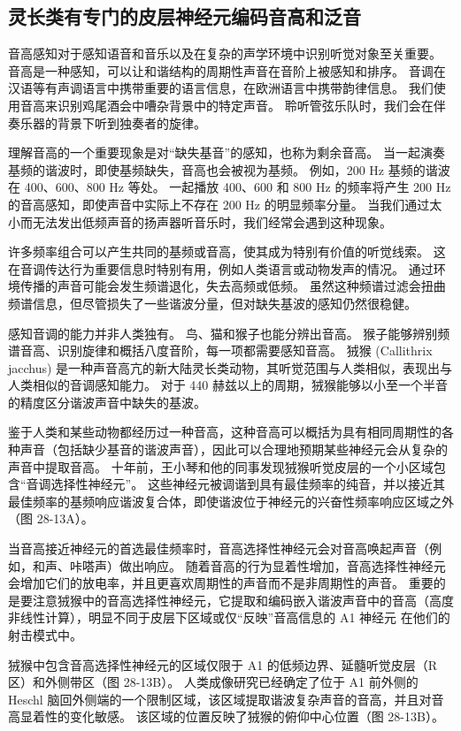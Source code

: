 \subsection{灵长类有专门的皮层神经元编码音高和泛音}
音高感知对于感知语音和音乐以及在复杂的声学环境中识别听觉对象至关重要。 音高是一种感知，可以让和谐结构的周期性声音在音阶上被感知和排序。 音调在汉语等有声调语言中携带重要的语言信息，在欧洲语言中携带韵律信息。 我们使用音高来识别鸡尾酒会中嘈杂背景中的特定声音。 聆听管弦乐队时，我们会在伴奏乐器的背景下听到独奏者的旋律。

理解音高的一个重要现象是对“缺失基音”的感知，也称为剩余音高。 当一起演奏基频的谐波时，即使基频缺失，音高也会被视为基频。 例如，200 Hz 基频的谐波在 400、600、800 Hz 等处。 一起播放 400、600 和 800 Hz 的频率将产生 200 Hz 的音高感知，即使声音中实际上不存在 200 Hz 的明显频率分量。 当我们通过太小而无法发出低频声音的扬声器听音乐时，我们经常会遇到这种现象。

许多频率组合可以产生共同的基频或音高，使其成为特别有价值的听觉线索。 这在音调传达行为重要信息时特别有用，例如人类语言或动物发声的情况。 通过环境传播的声音可能会发生频谱退化，失去高频或低频。 虽然这种频谱过滤会扭曲频谱信息，但尽管损失了一些谐波分量，但对缺失基波的感知仍然很稳健。

感知音调的能力并非人类独有。 鸟、猫和猴子也能分辨出音高。 猴子能够辨别频谱音高、识别旋律和概括八度音阶，每一项都需要感知音高。 狨猴 (Callithrix jacchus) 是一种声音高亢的新大陆灵长类动物，其听觉范围与人类相似，表现出与人类相似的音调感知能力。 对于 440 赫兹以上的周期，狨猴能够以小至一个半音的精度区分谐波声音中缺失的基波。

鉴于人类和某些动物都经历过一种音高，这种音高可以概括为具有相同周期性的各种声音（包括缺少基音的谐波声音），因此可以合理地预期某些神经元会从复杂的声音中提取音高。 十年前，王小琴和他的同事发现狨猴听觉皮层的一个小区域包含“音调选择性神经元”。 这些神经元被调谐到具有最佳频率的纯音，并以接近其最佳频率的基频响应谐波复合体，即使谐波位于神经元的兴奋性频率响应区域之外（图 28-13A）。

当音高接近神经元的首选最佳频率时，音高选择性神经元会对音高唤起声音（例如，和声、咔嗒声）做出响应。 随着音高的行为显着性增加，音高选择性神经元会增加它们的放电率，并且更喜欢周期性的声音而不是非周期性的声音。 重要的是要注意狨猴中的音高选择性神经元，它提取和编码嵌入谐波声音中的音高（高度非线性计算），明显不同于皮层下区域或仅“反映”音高信息的 A1 神经元 在他们的射击模式中。

狨猴中包含音高选择性神经元的区域仅限于 A1 的低频边界、延髓听觉皮层（R 区）和外侧带区（图 28-13B）。 人类成像研究已经确定了位于 A1 前外侧的 Heschl 脑回外侧端的一个限制区域，该区域提取谐波复杂声音的音高，并且对音高显着性的变化敏感。 该区域的位置反映了狨猴的俯仰中心位置（图 28-13B）。

